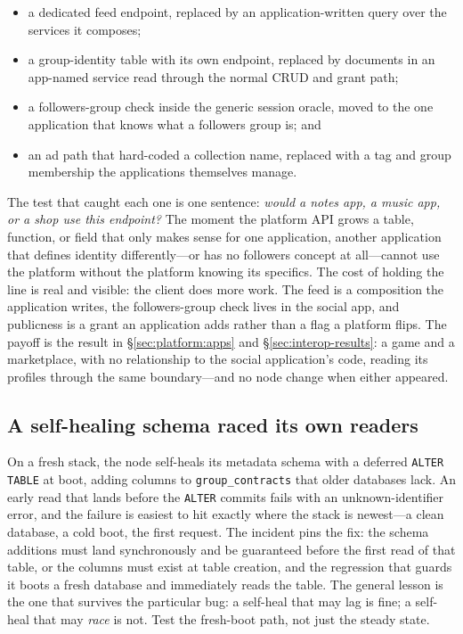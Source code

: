 \documentclass[sigconf, nonacm]{acmart}
\begin{document}
\begin{itemize}[leftmargin=*,nosep]
  \item a dedicated feed endpoint, replaced by an application-written query
  over the services it composes;
  \item a group-identity table with its own endpoint, replaced by documents
  in an app-named service read through the normal CRUD and grant path;
  \item a followers-group check inside the generic session oracle, moved to
  the one application that knows what a followers group is; and
  \item an ad path that hard-coded a collection name, replaced with a tag and
  group membership the applications themselves manage.
\end{itemize}

The test that caught each one is one sentence: \emph{would a notes app, a
music app, or a shop use this endpoint?} The moment the platform API grows a
table, function, or field that only makes sense for one application, another
application that defines identity differently---or has no followers
concept at all---cannot use the platform without the platform knowing its
specifics. The cost of holding the line is real and visible: the client does
more work. The feed is a composition the application writes, the
followers-group check lives in the social app, and publicness is a grant an
application adds rather than a flag a platform flips. The payoff is the
result in \S\ref{sec:platform:apps} and \S\ref{sec:interop-results}: a game
and a marketplace, with no relationship to the social application's code,
reading its profiles through the same boundary---and no node change when
either appeared.

\subsection{A self-healing schema raced its own readers}

On a fresh stack, the node self-heals its metadata schema with a deferred
\texttt{ALTER TABLE} at boot, adding columns to
\texttt{group\_contracts} that older databases lack. An early read that lands
before the \texttt{ALTER} commits fails with an unknown-identifier error, and
the failure is easiest to hit exactly where the stack is newest---a clean
database, a cold boot, the first request. The incident pins the fix: the
schema additions must land synchronously and be guaranteed before the first
read of that table, or the columns must exist at table creation, and the
regression that guards it boots a fresh database and immediately reads the
table. The general lesson is the one that survives the particular bug: a
self-heal that may lag is fine; a self-heal that may \emph{race} is not. Test
the fresh-boot path, not just the steady state.
\end{document}
